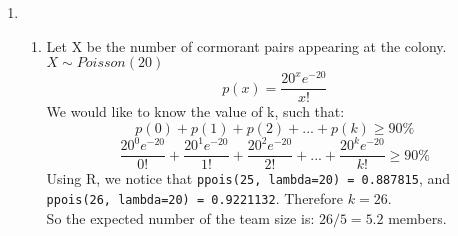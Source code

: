 \documentclass[11pt]{article}
\begin{document}
\begin{enumerate}[label=\textbf{Question \arabic*:},start=1]
\begin{enumerate}
  \item {\em [Optional bonus question]} 
\textbf{Proof:}\\
\begin{equation}
\begin{split}
\lim_{N\rightarrow\infty} \frac { {m \choose x}{N-m \choose n-x}}{ {N\choose n}} & = \lim_{N\rightarrow\infty} \frac { \frac{m!}{x!(m-x)!} \cdot \frac{(N-m)!}{(n-x)!(N-m-(n-x))!}}{ \frac{N!}{n!(N-n)!} } \\
& = \lim_{N\rightarrow\infty} \frac{n!}{x!(n-x)!} \cdot \frac{m! (N-m)! (N-n)!}{(m-x)! (N-m - (n-x))! N!} \\
& = \frac{n!}{x!(n-x)!}  \lim_{N\rightarrow\infty} \frac{(m-x+1)...m \cdot (N-m-(n-x)+1)...(N-m)}{(N-n+1)...N} \\
& = \frac{n!}{x!(n-x)!}  (\frac{m}{N})^x (\frac{N-m}{N})^{n-x} \\
& = {n \choose x} p^x (1-p)^{n-x}
\end{split}
\end{equation}

line 1 just expand the combinations. \\
line 2 rearranges the division and pulls out  $\frac{n!}{x!(n-x)!}$ \\
line 3 cancels same items in $m!$ with $(m-x)!$,  $(N-m)!$ with $(N-m-(n-x))!$, $N!$ with $(N-n)!$. \\
line 4, notice that there are $x$ items in $(m-x+1)...m$, and there are $(n-x)$ items in $(N-m-(n-x)+1)...(N-m)$, and there are $n$ items in $(N-n+1)...N$, also $n = x + n-x$. So when we take the limit and drop the lower order terms, the highest order terms are $m^x$, $(N-m)^{n-x}$, $N^x \cdot N^{n-x}$. Therefore we get the result in line 4. \\
line 5, notice that expression in line 4 is just the expanded form of line 5, after replacing $\frac{m}{N}$ with $p$.\\
Q.E.D.

\end{enumerate}




\vspace*{3mm}

\item 
\begin{enumerate}
\item
Let X be the number of cormorant pairs appearing at the colony. \( X \sim Poisson(20) \) \\
\[
p(x) = \frac{20^x e^{-20}}{x!}
\]
We would like to know the value of k, such that:
\[
p(0) + p(1) + p(2) + ... +  p(k) \geq 90\%
\]
\[
\frac{20^0 e^{-20}}{0!} + \frac{20^1 e^{-20}}{1!} + \frac{20^2 e^{-20}}{2!} + ... + \frac{20^k e^{-20}}{k!} \geq 90\%
\]
Using R, we notice that \texttt{ppois(25, lambda=20) = 0.887815}, and \texttt{ppois(26, lambda=20) = 0.9221132}. Therefore $k = 26$. \\
So the expected number of the team size is: $26/5 = 5.2$ members.\\


\end{enumerate}
\end{enumerate}
\end{document}
